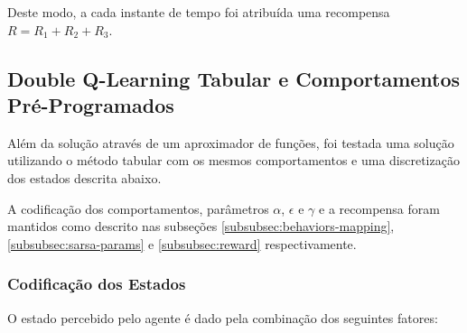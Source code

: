 Deste modo, a cada instante de tempo foi atribuída uma recompensa $R = R_1 + R_2 + R_3$.

\subsection{Double Q-Learning Tabular e Comportamentos Pré-Programados}

Além da solução através de um aproximador de funções, foi testada uma solução utilizando o método tabular com os mesmos comportamentos e uma discretização dos estados descrita abaixo.

A codificação dos comportamentos, parâmetros $\alpha$, $\epsilon$ e $\gamma$ e a recompensa foram mantidos como descrito nas subseções \ref{subsubsec:behaviors-mapping}, \ref{subsubsec:sarsa-params} e \ref{subsubsec:reward} respectivamente.

\subsubsection{Codificação dos Estados}
\label{subsubsec:state-encoding}

O estado percebido pelo agente é dado pela combinação dos seguintes fatores:

